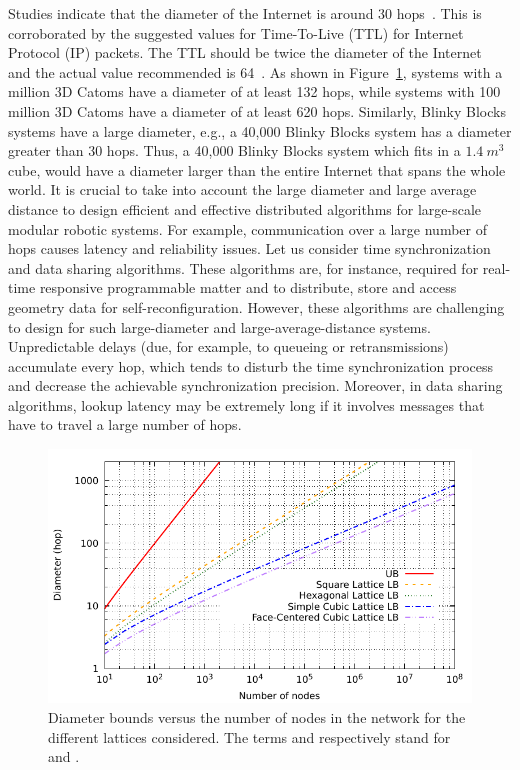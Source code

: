 \begin{description}
	Studies indicate that the diameter of the Internet is around 30 hops~\cite{latapy2006measuring,leguay2005describing,cardozoend}. This is corroborated by the suggested values for Time-To-Live (TTL) for Internet Protocol (IP) packets. The TTL should be twice the diameter of the Internet~\cite{rfc1122} and the actual value recommended is 64~\cite{rfc1700,iana}. As shown in Figure~\ref{fig:context:bounds}, systems with a million 3D Catoms have a diameter of at least 132 hops, while systems with 100 million 3D Catoms have a diameter of at least 620 hops. Similarly, Blinky Blocks systems have a large diameter, e.g., a 40,000 Blinky Blocks system has a diameter greater than 30 hops. Thus, a 40,000 Blinky Blocks system which fits in a $1.4\ m^3$ cube, would have a diameter larger than the entire Internet that spans the whole world. It is crucial to take into account the large diameter and large average distance to design efficient and effective distributed algorithms for large-scale modular robotic systems. For example, communication over a large number of hops causes latency and reliability issues. Let us consider time synchronization and data sharing algorithms. These algorithms are, for instance, required for real-time responsive programmable matter and to distribute, store and access geometry data for self-reconfiguration. However, these algorithms are challenging to design for such large-diameter and large-average-distance systems. Unpredictable delays (due, for example, to queueing or retransmissions) accumulate every hop, which tends to disturb the time synchronization process and decrease the achievable synchronization precision. Moreover, in data sharing algorithms, lookup latency may be extremely long if it involves messages that have to travel a large number of hops.
\end{description}

\begin{figure}[!h]
	\centering
	\includegraphics[width=0.9\linewidth]{images/network-characterization/bounds}
	\caption{Diameter bounds versus the number of nodes in the network for the different lattices considered. The terms  and  respectively stand for  and .\label{fig:context:bounds}}
\end{figure}


